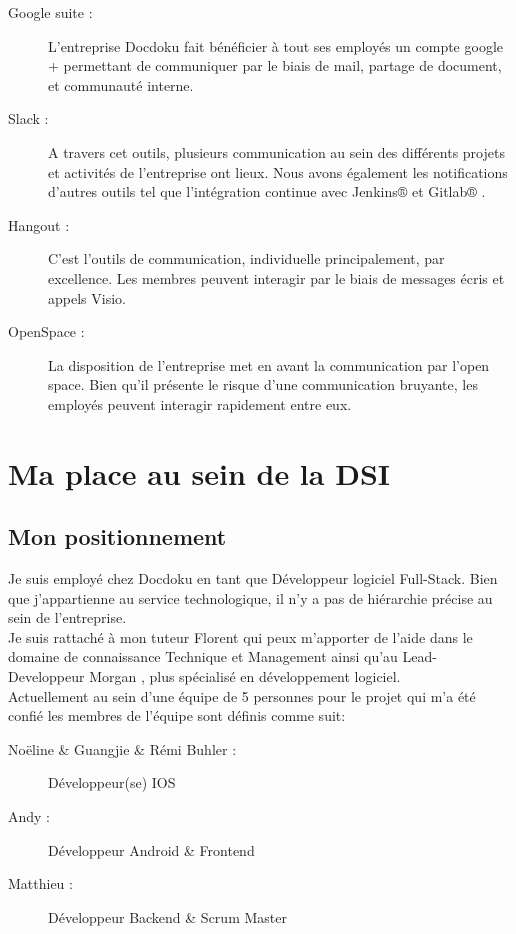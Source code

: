 \documentclass[11pt]{report}
\begin{document}
			\begin{description}
				\item[Google suite :] L'entreprise Docdoku fait bénéficier à tout ses employés un compte google + permettant de communiquer par le biais de mail, partage de document, et communauté interne.
				\item[Slack :] A travers cet outils, plusieurs communication au sein des différents projets et activités de l'entreprise ont lieux. Nous avons également les notifications d'autres outils tel que l'intégration continue avec Jenkins® et Gitlab® .
				\item[Hangout :] C'est l'outils de communication, individuelle principalement, par excellence. Les membres peuvent interagir par le biais de messages écris et appels Visio.
				\item[OpenSpace :] La disposition de l'entreprise met en avant la communication par l'open space. Bien qu'il présente le risque d'une communication bruyante, les employés peuvent interagir rapidement entre eux.
			\end{description}

\part{Ma place au sein de la DSI}

	\chapter{Mon positionnement}

		Je suis employé chez Docdoku en tant que Développeur logiciel Full-Stack. Bien que j'appartienne au service technologique, il n'y a pas de hiérarchie précise au sein de l'entreprise.\\

		Je suis rattaché à mon tuteur Florent  qui peux m'apporter de l'aide dans le domaine de connaissance Technique et Management ainsi qu'au Lead-Developpeur Morgan , plus spécialisé en développement logiciel.\\

		Actuellement au sein d'une équipe de 5 personnes pour le projet qui m'a été confié les membres de l'équipe sont définis comme suit:\\
		\begin{description}
			\item[Noëline  \& Guangjie  \& Rémi Buhler :] Développeur(se) IOS 
			\item[Andy :] Développeur Android \& Frontend
			\item[Matthieu :] Développeur Backend \& Scrum Master
		\end{description}
\end{document}
